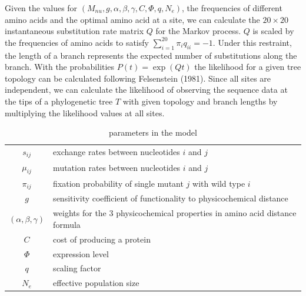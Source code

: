 \documentclass[13pt]{article}
\begin{document}
Given the values for $(M_{nu},g, \alpha, \beta, \gamma, C, \Phi, q, N_e)$, the frequencies of different amino acids and the optimal amino acid at a site, we can calculate the $20 \times 20$ instantaneous substitution rate matrix $Q$ for the Markov process. $Q$ is scaled by the frequencies of amino acids to satisfy $\sum_{i=1}^{20} \pi_i q_{ii}= -1$.
Under this restraint, the length of a branch represents the expected number of substitutions along the branch.
With the probabilities $P(t)  = \exp(Qt)$ the likelihood for a given tree topology can be calculated following Felsenstein (1981).
Since all sites are independent, we can calculate the likelihood of observing the sequence data at the tips of a phylogenetic tree $T$ with given topology and branch lengths by multiplying the likelihood values at all sites.\\

\begin{table}[h]
\centering
\caption{parameters in the model}
\begin{tabular}{ c p{10cm} }
\hline
$s_{ij}$ & exchange rates between nucleotides $i$ and $j$ \\
$\mu_{ij}$ & mutation rates between nucleotides $i$ and $j$\\
$\pi_{ij}$ & fixation probability of single mutant $j$ with wild type $i$\\
$g$       & sensitivity coefficient of functionality to physicochemical distance \\
$(\alpha,\beta,\gamma)$ & weights for the 3 physicochemical properties in amino acid distance formula \\
$C$ & cost of producing a protein\\
$\Phi$ & expression level \\
$q$ & scaling factor \\
$N_e$ & effective population size \\
\hline
\end{tabular}

\label{tb: para}
\end{table}
\end{document}
